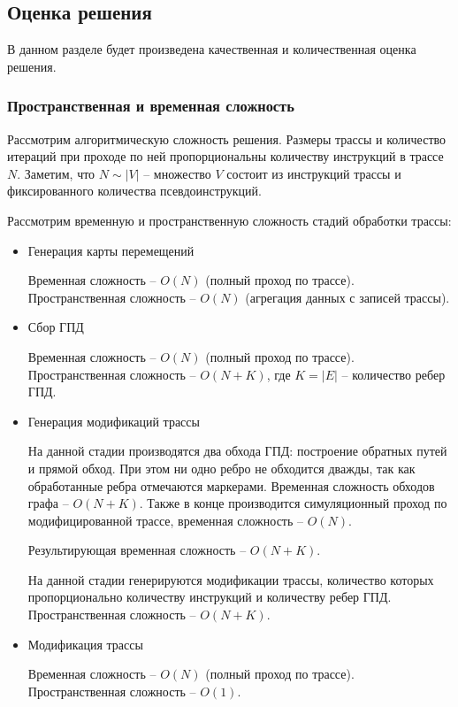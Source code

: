 \subsection{Оценка решения}

В данном разделе будет произведена качественная и количественная оценка решения.

\subsubsection{Пространственная и временная сложность} \label{sec:complexity}

Рассмотрим алгоритмическую сложность \cite{clrs_algorithms} решения. Размеры трассы и количество итераций при проходе по ней пропорциональны количеству инструкций в трассе $N$. Заметим, что $N \sim |V|$ -- множество $V$ состоит из инструкций трассы и фиксированного количества псевдоинструкций.

Рассмотрим временную и пространственную сложность стадий обработки трассы:

\begin{itemize}
    \item Генерация карты перемещений

    Временная сложность -- $O(N)$ (полный проход по трассе).
    Пространственная сложность -- $O(N)$ (агрегация данных с записей трассы).

    \item Сбор ГПД

    Временная сложность -- $O(N)$ (полный проход по трассе).
    Пространственная сложность -- $O(N + K)$, где $K = |E|$ -- количество ребер ГПД.

    \item Генерация модификаций трассы

    На данной стадии производятся два обхода ГПД: построение обратных путей и прямой обход. При этом ни одно ребро не обходится дважды, так как обработанные ребра отмечаются маркерами. Временная сложность обходов графа -- $O(N + K)$. Также в конце производится симуляционный проход по модифицированной трассе, временная сложность -- $O(N)$.

    Результирующая временная сложность -- $O(N + K)$.

    На данной стадии генерируются модификации трассы, количество которых пропорционально количеству инструкций и количеству ребер ГПД. Пространственная сложность -- $O(N + K)$.

    \item Модификация трассы

    Временная сложность -- $O(N)$ (полный проход по трассе).
    Пространственная сложность -- $O(1)$.
\end{itemize}

